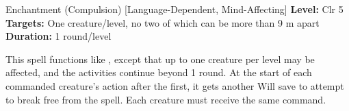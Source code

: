 {Enchantment (Compulsion) [Language-Dependent, Mind-Affecting]}
{
	\textbf{Level:}
	Clr 5\\
	\textbf{Targets:}
	One creature/level, no two of which can be more than 9 m apart\\
	\textbf{Duration:}
	1 round/level\\
}
{
	This spell functions like , except that up to one creature per level may be affected, and the activities continue beyond 1 round. At the start of each commanded creature's action after the first, it gets another Will save to attempt to break free from the spell. Each creature must receive the same command.

}
